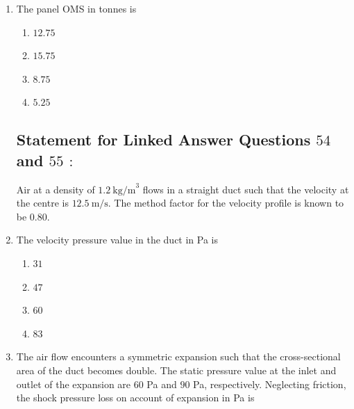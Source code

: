 \documentclass[journal,12pt,onecolumn]{IEEEtran}
\theoremstyle{remark}
\begin{document}
\begin{enumerate}
\hfill{}

\begin{multicols}{4}
\begin{enumerate}
\item $945$
\item $1240$
\item $1890$
\item $2530$
\end{enumerate}
\end{multicols}

\item The panel OMS in tonnes is


\hfill{}

\begin{multicols}{4}
\begin{enumerate}
\item $12.75$
\item $15.75$
\item $8.75$
\item $5.25$
\end{enumerate}
\end{multicols}

\subsection*{Statement for Linked Answer Questions $54$ and $55$ $\colon$}
Air at a density of $1.2\ \text{kg/m}^3$ flows in a straight duct such that the velocity at the centre is $12.5\ \text{m/s}$. The method factor for the velocity profile is known to be $0.80$.
\item The velocity pressure value in the duct in Pa is 


\hfill{}
\begin{multicols}{4}
\begin{enumerate}
\item $31$
\item $47$
\item $60$
\item $83$
\end{enumerate}
\end{multicols}

\item  The air flow encounters a symmetric expansion such that the cross-sectional area of the duct becomes double. The static pressure value at the inlet and outlet of the expansion are $60$ Pa and $90$ Pa, respectively. Neglecting friction, the shock pressure loss on account of expansion in Pa is


\end{enumerate}
\end{document}
